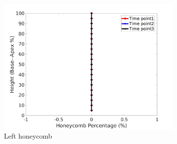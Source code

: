 \begin{figure}[H]
\begin{subfigure}{.42\linewidth}
  \includegraphics[width=\linewidth,trim={{.0\wd0} {.0\wd0} {.0\wd0} {.0\wd0}},clip]{Appendix/Image_AppexA/BaseToApex/IPF9LeftLungHoneycombDiseaseAgainstHeight.jpg} %
  \caption{Left honeycomb}
  \label{fig:IPF9DiseaseAgainstHeight-e} 
\end{subfigure} 
\begin{subfigure}{.42\linewidth}%

\end{subfigure}
\end{figure}
